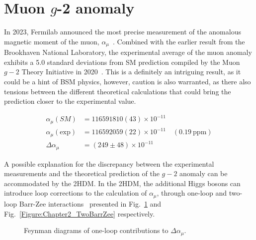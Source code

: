 \section{\texorpdfstring{Muon $g$-2 anomaly}{Muon g-2 anomaly}}

In 2023, Fermilab announced the most precise measurement of the anomalous magnetic moment of the muon, $\alpha_\mu$~\cite{Fermilab_g-2}. Combined with the earlier result from the Brookhaven National Laboratory, the experimental average of the muon anomaly exhibits a 5.0 standard deviations from SM prediction compiled by the Muon $g-2$ Theory Initiative in 2020~\cite{Muon_Theory_Initiative}. This is a definitely an intriguing result, as it could be a hint of BSM physics, however, caution is also warranted, as there also tensions between the different theoretical calculations that could bring the prediction closer to the experimental value.


\begin{equation}
\begin{aligned}
    \alpha_\mu (SM) &= 116591810(43) \times 10^{-11} \\
    \alpha_\mu (\text{exp}) &= 116592059(22) \times 10^{-11} \quad (0.19~\text{ppm}) \\
    \Delta \alpha_\mu &= (249\pm48) \times 10^{-11}
\end{aligned}
\end{equation}

A possible explanation for the discrepancy between the experimental measurements and the theoretical prediction of the $g-2$ anomaly can be accommodated by the 2HDM. In the 2HDM, the additional Higgs bosons can introduce loop corrections to the calculation of $\alpha_\mu$, through one-loop and two-loop Barr-Zee interactions~\cite{Barr_Zee_1,Barr_Zee_2} presented in Fig.~\ref{Figure:Chapter2_OneBarrZee} and Fig.~\ref{Figure:Chapter2_TwoBarrZee} respectively. 

\begin{figure}[h]
    \centering
    \begin{subfigure}{0.45\textwidth}
        \centering
        
    \end{subfigure}
    \hfill
    \begin{subfigure}{0.45\textwidth}
        \centering
        \raisebox{8.2mm}{}
    \end{subfigure}

    \caption{Feynman diagrams of one-loop contributions to $\Delta\alpha_\mu$.}
    \label{Figure:Chapter2_OneBarrZee}
\end{figure}

